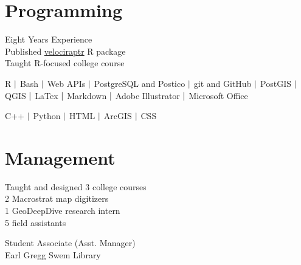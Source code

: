 \documentclass[]{deedy-resume-openfont}
\begin{document}
\begin{minipage}[t]{0.33\textwidth}

\section{Programming}
\textbullet{}  Eight Years Experience \\
\textbullet{}  Published \href{https://cran.r-project.org/web/packages/velociraptr/index.html}{velociraptr} R package \\
\textbullet{}  Taught R-focused college course \\
\sectionsep

R $\textcolor{black}{|}$ Bash $\textcolor{black}{|}$ Web APIs $\textcolor{black}{|}$ PostgreSQL and Postico $\textcolor{black}{|}$ git and GitHub $\textcolor{black}{|}$ PostGIS $\textcolor{black}{|}$ QGIS $\textcolor{black}{|}$ LaTex $\textcolor{black}{|}$ Markdown $\textcolor{black}{|}$ Adobe Illustrator $\textcolor{black}{|}$ Microsoft Office \\
\sectionsep

C++ $\textcolor{black}{|}$ Python $\textcolor{black}{|}$ HTML $\textcolor{black}{|}$ ArcGIS $\textcolor{black}{|}$ CSS
\sectionsep

\section{Management}
\textbullet{} Taught and designed 3 college courses \\
\textbullet{} 2 Macrostrat map digitizers \\
\textbullet{} 1 GeoDeepDive research intern \\
\textbullet{} 5 field assistants \\
\sectionsep

\textbullet{} Student Associate (Asst. Manager) \\ 
Earl Gregg Swem Library
\sectionsep


\end{minipage}
\end{document}
